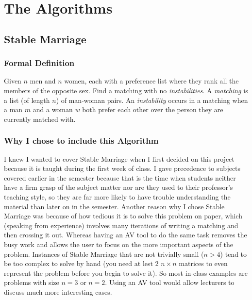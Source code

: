 \chapter{The Algorithms} 
\label{the-algorithms}
\section{Stable Marriage}
%
\subsection{Formal Definition}
Given $n$ men and $n$ women, 
each with a preference list where they rank all the members of the opposite sex. 
Find a matching with no \textit{instabilities}. 
\newline\newline
A \textit{matching} is a list (of length $n$) of man-woman pairs.
An \textit{instability} occurs in a matching when 
a man $m$ and a woman $w$ both prefer each other over the person they are currently matched with. 
%
\subsection{Why I chose to include this Algorithm}
\hspace{-0.26in}
I knew I wanted to cover Stable Marriage when I first decided on this project
because it is taught during the first week of class.
I gave precedence to subjects covered earlier in the semester 
because that is the time when students neither have a firm grasp of the subject matter 
nor are they used to their professor's teaching style, 
so they are far more likely to have trouble understanding the material
than later on in the semester. 
\newline\newline
Another reason why I chose Stable Marriage was because of how tedious it is to 
solve this problem on paper, which (speaking from experience) involves many iterations of 
writing a matching and then crossing it out. 
Whereas having an AV tool to do the same task removes the busy work and allows 
the user to focus on the more important aspects of the problem.
\newline\newline
Instances of Stable Marriage that are not trivially small ($n > 4$) 
tend to be too complex to solve by hand 
(you need at lest 2 $n\times n$ matrices to even represent the problem
before you begin to solve it). 
So most in-class examples are problems with size $n = 3$ or $n = 2$.
Using an AV tool would allow lecturers to discuss much more interesting cases. 
%
